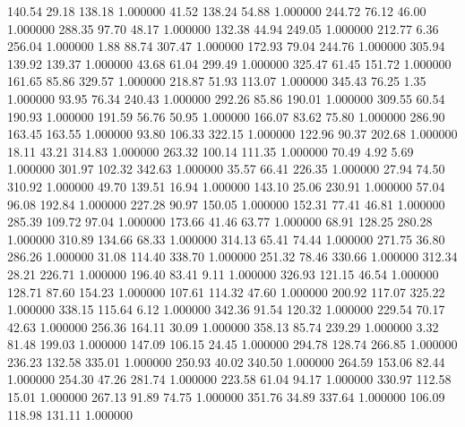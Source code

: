     140.54     29.18    138.18  1.000000
     41.52    138.24     54.88  1.000000
    244.72     76.12     46.00  1.000000
    288.35     97.70     48.17  1.000000
    132.38     44.94    249.05  1.000000
    212.77      6.36    256.04  1.000000
      1.88     88.74    307.47  1.000000
    172.93     79.04    244.76  1.000000
    305.94    139.92    139.37  1.000000
     43.68     61.04    299.49  1.000000
    325.47     61.45    151.72  1.000000
    161.65     85.86    329.57  1.000000
    218.87     51.93    113.07  1.000000
    345.43     76.25      1.35  1.000000
     93.95     76.34    240.43  1.000000
    292.26     85.86    190.01  1.000000
    309.55     60.54    190.93  1.000000
    191.59     56.76     50.95  1.000000
    166.07     83.62     75.80  1.000000
    286.90    163.45    163.55  1.000000
     93.80    106.33    322.15  1.000000
    122.96     90.37    202.68  1.000000
     18.11     43.21    314.83  1.000000
    263.32    100.14    111.35  1.000000
     70.49      4.92      5.69  1.000000
    301.97    102.32    342.63  1.000000
     35.57     66.41    226.35  1.000000
     27.94     74.50    310.92  1.000000
     49.70    139.51     16.94  1.000000
    143.10     25.06    230.91  1.000000
     57.04     96.08    192.84  1.000000
    227.28     90.97    150.05  1.000000
    152.31     77.41     46.81  1.000000
    285.39    109.72     97.04  1.000000
    173.66     41.46     63.77  1.000000
     68.91    128.25    280.28  1.000000
    310.89    134.66     68.33  1.000000
    314.13     65.41     74.44  1.000000
    271.75     36.80    286.26  1.000000
     31.08    114.40    338.70  1.000000
    251.32     78.46    330.66  1.000000
    312.34     28.21    226.71  1.000000
    196.40     83.41      9.11  1.000000
    326.93    121.15     46.54  1.000000
    128.71     87.60    154.23  1.000000
    107.61    114.32     47.60  1.000000
    200.92    117.07    325.22  1.000000
    338.15    115.64      6.12  1.000000
    342.36     91.54    120.32  1.000000
    229.54     70.17     42.63  1.000000
    256.36    164.11     30.09  1.000000
    358.13     85.74    239.29  1.000000
      3.32     81.48    199.03  1.000000
    147.09    106.15     24.45  1.000000
    294.78    128.74    266.85  1.000000
    236.23    132.58    335.01  1.000000
    250.93     40.02    340.50  1.000000
    264.59    153.06     82.44  1.000000
    254.30     47.26    281.74  1.000000
    223.58     61.04     94.17  1.000000
    330.97    112.58     15.01  1.000000
    267.13     91.89     74.75  1.000000
    351.76     34.89    337.64  1.000000
    106.09    118.98    131.11  1.000000
